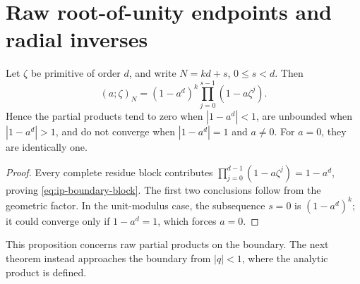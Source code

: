 \section{Raw root-of-unity endpoints and radial inverses}
\label{sec:ip-cyclotomic}

\begin{proposition}
\label{prop:ip-boundary-products}
Let \(\zeta\) be primitive of order \(d\), and write \(N=kd+s\),
\(0\leq s<d\).  Then
\begin{equation}
 (a;\zeta)_N=(1-a^d)^k\prod_{j=0}^{s-1}(1-a\zeta^j).
 \label{eq:ip-boundary-block}
\end{equation}
Hence the partial products tend to zero when \(|1-a^d|<1\), are unbounded
when \(|1-a^d|>1\), and do not converge when \(|1-a^d|=1\) and \(a\ne0\).
For \(a=0\), they are identically one.
\end{proposition}

\begin{proof}
Every complete residue block contributes
\(\prod_{j=0}^{d-1}(1-a\zeta^j)=1-a^d\), proving
\cref{eq:ip-boundary-block}.  The first two conclusions follow from the
geometric factor.  In the unit-modulus case, the subsequence \(s=0\) is
\((1-a^d)^k\); it could converge only if \(1-a^d=1\), which forces \(a=0\).
\end{proof}

This proposition concerns raw partial products on the boundary.  The next
theorem instead approaches the boundary from \(|q|<1\), where the analytic
product is defined.

